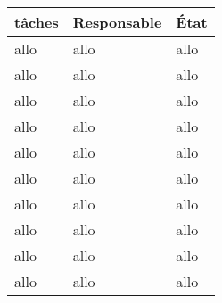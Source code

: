 \Large\begin{tabularx}{\linewidth}{
    |>{\hsize=1.95\hsize}X|%
    >{\hsize=0.7\hsize}X|%
    >{\hsize=0.35\hsize}X|%
  }
    \hline
    tâches & Responsable & État\\\hline
    allo & allo & allo\\\hline
    allo & allo & allo\\\hline
    allo & allo & allo\\\hline
    allo & allo & allo\\\hline
    allo & allo & allo\\\hline
    allo & allo & allo\\\hline
    allo & allo & allo\\\hline
    allo & allo & allo\\\hline
    allo & allo & allo\\\hline
    allo & allo & allo\\\hline
  \end{tabularx}
     